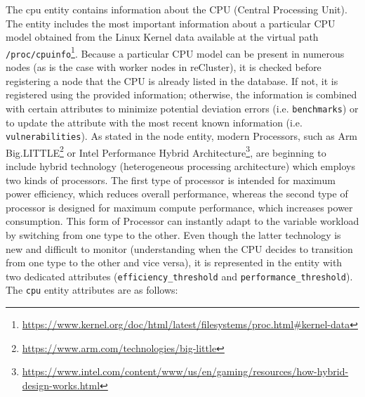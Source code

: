 The cpu entity contains information about the CPU (Central Processing Unit).
\newline
The entity includes the most important information about a particular CPU model obtained
from the Linux Kernel data available at the virtual path \texttt{/proc/cpuinfo}\footnote{\url{https://www.kernel.org/doc/html/latest/filesystems/proc.html\#kernel-data}}.
\newline
Because a particular CPU model can be present in numerous nodes (as is the case with
worker nodes in reCluster), it is checked before registering a node that the CPU
is already listed in the database. If not, it is registered using the provided information;
otherwise, the information is combined with certain attributes to minimize potential
deviation errors (i.e. \texttt{benchmarks}) or to update the attribute with the most
recent known information (i.e. \texttt{vulnerabilities}).
\newline
As stated in the node entity, modern Processors, such as Arm Big.LITTLE\footnote{\url{https://www.arm.com/technologies/big-little}}
or Intel Performance Hybrid Architecture\footnote{\url{https://www.intel.com/content/www/us/en/gaming/resources/how-hybrid-design-works.html}},
are beginning to include hybrid technology (heterogeneous processing
architecture) which employs two kinds of processors. The first type of processor
is intended for maximum power efficiency, which reduces overall performance,
whereas the second type of processor is designed for maximum compute performance,
which increases power consumption. This form of Processor can instantly adapt to
the variable workload by switching from one type to the other\cite{cpu_arm}\cite{cpu_intel}.
Even though the latter technology is new and difficult to monitor (understanding
when the CPU decides to transition from one type to the other and vice versa),
it is represented in the entity with two dedicated attributes (\texttt{efficiency\_threshold}
and \texttt{performance\_threshold}).
\newline
The \texttt{cpu} entity attributes are as follows:

